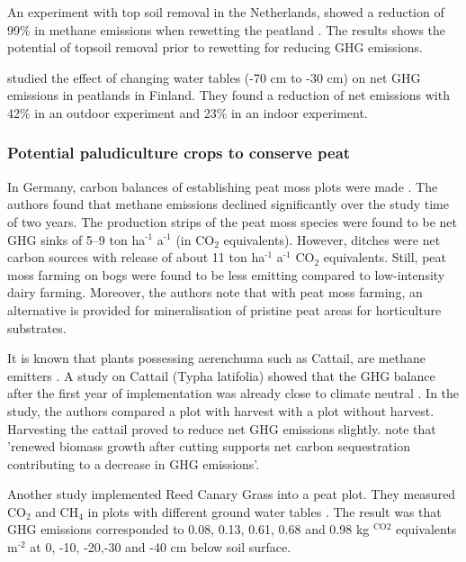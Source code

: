 \documentclass[12pt,a4paper,titlepage]{article}
\newcommand{\sur}[1]{\ensuremath{^{\textrm{#1}}}}
\newcommand{\sous}[1]{\ensuremath{_{\textrm{#1}}}}
\begin{document}
An experiment with top soil removal in the Netherlands, showed a reduction of 99\% in methane emissions when rewetting the peatland \citep{harpenslager2015rewetting}. The results shows the potential of topsoil removal prior to rewetting for reducing GHG emissions. 

\citet{Regina2015} studied the effect of changing water tables (-70 cm to -30 cm) on net GHG emissions in peatlands in Finland. They found a reduction of net emissions with 42\% in an outdoor experiment and 23\% in an indoor experiment.  

\subsubsection{Potential paludiculture crops to conserve peat}

In Germany, carbon balances of establishing peat moss plots were made \citep{gunther2017greenhouse}. The authors found that methane emissions declined significantly over the study time of two years. The production strips of the peat moss  species were found to be net GHG sinks of 5–9 ton ha\sur{-1} a\sur{-1} (in CO\sous{2} equivalents). However, ditches were net carbon sources with release of about 11 ton ha\sur{-1} a\sur{-1} CO\sous{2} equivalents. Still, peat moss farming on bogs were found to be less emitting compared to low-intensity dairy farming. Moreover, the authors note that with peat moss farming, an alternative is provided for mineralisation of pristine peat areas for horticulture substrates.
 
It is known that plants possessing aerenchuma such as Cattail, are methane emitters \citep{wichtmann2016paludiculture}. A study on Cattail (Typha latifolia) showed that the GHG balance after the first year of implementation was already close to climate neutral \citep{guntherghgtypha}. In the study, the authors compared a plot with harvest with a plot without harvest. Harvesting the cattail proved to reduce net GHG emissions slightly. \citet{wichtmann2016paludiculture} note that 'renewed biomass growth after cutting supports net carbon sequestration contributing to a decrease in GHG emissions'. 

Another study implemented Reed Canary Grass into a peat plot. They measured CO\sous{2} and CH\sous{4} in plots with different ground water tables \citep{Karki2014}. The result was that GHG emissions corresponded to 0.08, 0.13, 0.61, 0.68 and 0.98 kg \sur{CO2} equivalents m\sur{-2} at 0, -10, -20,-30 and -40 cm below soil surface.
\end{document}
